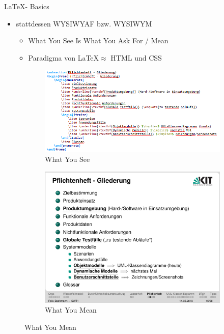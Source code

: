 \documentclass[18pt]{beamer}
\begin{document}
\begin{frame}{\LaTeX - Basics}
	\begin{itemize}
		\item stattdessen WYSIWYAF bzw. WYSIWYM
		\begin{itemize}
			\item What You See Is What You Ask For / Mean
			\item Paradigma von \LaTeX $\approx$ HTML und CSS
		\end{itemize}
	\end{itemize}
	\begin{figure}
		\begin{subfigure}{0.55\textwidth}
			\centering
			\caption{\small What You See}
			\includegraphics[scale=0.36]{pics/tut1/wysiwym_raw.PNG}
		\end{subfigure}%
		\begin{subfigure}{0.45\textwidth}
			\centering
			\caption{\small What You Mean}
			\includegraphics[scale=0.2]{pics/tut1/wysiwym.PNG}
		\end{subfigure}
	\end{figure}
\end{frame}
\end{document}
